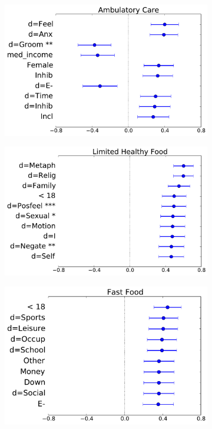 \begin{figure}
\centering
\begin{subfigure}[b]{0.33\textwidth}
\centering
\includegraphics[width=\columnwidth,height=.6\columnwidth]{figs/ambulatorycaresensitiveconditions}
\label{fig.ambulatorycaresensitiveconditions}
\end{subfigure}
\begin{subfigure}[b]{0.33\textwidth}
\centering
\includegraphics[width=\columnwidth,height=.6\columnwidth]{figs/limitedaccesstohealthyfoods}
\label{fig.limitedaccesstohealthyfoods}
\end{subfigure}
\begin{subfigure}[b]{0.33\textwidth}
\centering
\includegraphics[width=\columnwidth,height=.6\columnwidth]{figs/fastfoods}

\end{subfigure}
\end{figure}
